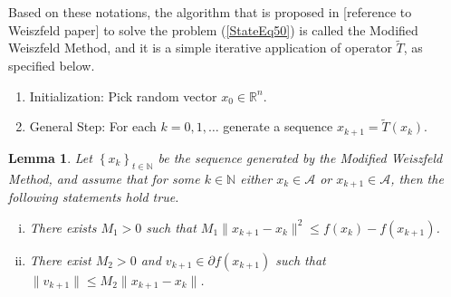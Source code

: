 \documentclass[11pt]{article}
\numberwithin{equation}{section}
\newtheorem{lemma}{Lemma}[proposition]
\begin{document}
Based on these notations, the algorithm that is proposed in [reference to Weiszfeld paper] to solve the problem (\ref{StateEq50}) is called the Modified Weiszfeld Method, and it is a simple iterative application of operator $\tilde{T}$, as specified below.
\begin{enumerate}[(1)]
	\item Initialization: Pick random vector $x_0 \in \mathbb{R}^{n}.$
	\item General Step: For each $k=0,1, \ldots$ generate a sequence $x_{k+1} = \tilde{T}(x_k)$.
\end{enumerate}

\begin{lemma}
Let $\left\lbrace x_k \right\rbrace_{t \in \mathbb{N}}$ be the sequence generated by the Modified Weiszfeld Method, and assume that for some $k \in \mathbb{N}$ either $x_k \in \mathcal{A}$ or $x_{k+1} \in \mathcal{A}$, then the following statements hold true.
\begin{enumerate}[(i)]
	\item There exists $M_1 > 0$ such that $M_1 \|x_{k+1} - x_k\|^2 \leq f(x_k) - f(x_{k+1})$.
	\item There exist $M_2 > 0$ and $v_{k+1} \in \partial f(x_{k+1})$ such that $\|v_{k+1}\| \leq M_2 \|x_{k+1} - x_k\|$.
\end{enumerate}
\end{lemma}
\end{document}

